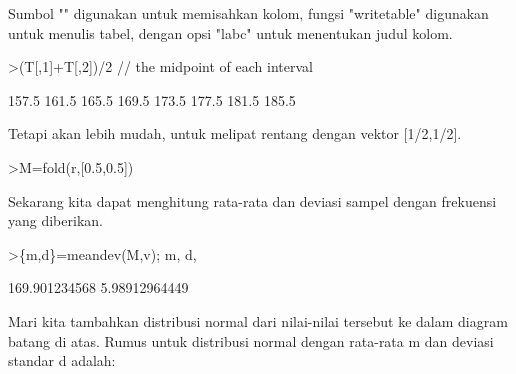 \documentclass[a4paper,10pt]{article}
\begin{document}
\begin{eulernotebook}
\begin{eulercomment}
\begin{eulercomment}
\begin{eulercomment}
\begin{eulercomment}
\begin{eulercomment}
Sumbol "\textbar{}" digunakan untuk memisahkan kolom, fungsi "writetable"
digunakan untuk menulis tabel, dengan opsi "labc" untuk menentukan
judul kolom.
\end{eulercomment}
\begin{eulerprompt}
>(T[,1]+T[,2])/2 // the midpoint of each interval
\end{eulerprompt}
\begin{euleroutput}
          157.5 
          161.5 
          165.5 
          169.5 
          173.5 
          177.5 
          181.5 
          185.5 
\end{euleroutput}
\begin{eulercomment}
Tetapi akan lebih mudah, untuk melipat rentang dengan vektor
[1/2,1/2].
\end{eulercomment}
\begin{eulerprompt}
>M=fold(r,[0.5,0.5])
\end{eulerprompt}
\begin{euleroutput}
  [157.5,  161.5,  165.5,  169.5,  173.5,  177.5,  181.5,  185.5]
\end{euleroutput}
\begin{eulercomment}
Sekarang kita dapat menghitung rata-rata dan deviasi sampel dengan
frekuensi yang diberikan.
\end{eulercomment}
\begin{eulerprompt}
>\{m,d\}=meandev(M,v); m, d,
\end{eulerprompt}
\begin{euleroutput}
  169.901234568
  5.98912964449
\end{euleroutput}
\begin{eulercomment}
Mari kita tambahkan distribusi normal dari nilai-nilai tersebut ke
dalam diagram batang di atas. Rumus untuk distribusi normal dengan
rata-rata m dan deviasi standar d adalah:


\end{eulercomment}
\end{eulercomment}
\end{eulercomment}
\end{eulercomment}
\end{eulercomment}
\end{eulernotebook}
\end{document}
